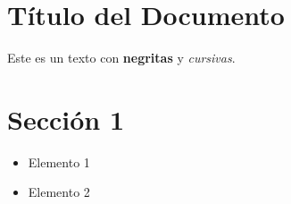 \documentclass{article}
\begin{document}
\section{Título del Documento}
Este es un texto con \textbf{negritas} y \emph{cursivas}.

\section{Sección 1}
\begin{itemize}
  \item Elemento 1
  \item Elemento 2
\end{itemize}
\end{document}
